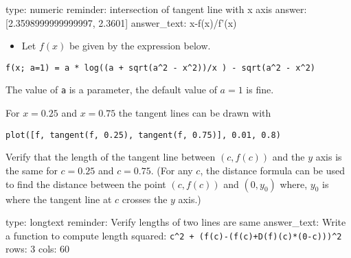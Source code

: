 \documentclass[12pt]{article}
\begin{document}
\begin{answer}
    type: numeric
    reminder: intersection of tangent line with x axis
    answer: [2.3598999999999997, 2.3601]
answer_text: x-f(x)/f'(x) 
\end{answer}

\begin{itemize}
\itemsep1pt\parskip0pt
\item
  Let $f(x)$ be given by the expression below.
\end{itemize}



\begin{verbatim}
f(x; a=1) = a * log((a + sqrt(a^2 - x^2))/x ) - sqrt(a^2 - x^2)
\end{verbatim}
The value of \texttt{a} is a parameter, the default value of $a=1$ is
fine.

For $x=0.25$ and $x=0.75$ the tangent lines can be drawn with



\begin{verbatim}
plot([f, tangent(f, 0.25), tangent(f, 0.75)], 0.01, 0.8)
\end{verbatim}
Verify that the length of the tangent line between $(c, f(c))$ and the
$y$ axis is the same for $c=0.25$ and $c=0.75$. (For any $c$, the
distance formula can be used to find the distance between the point
$(c, f(c))$ and $(0, y_0)$ where, $y_0$ is where the tangent line at $c$
crosses the $y$ axis.)

\begin{answer}
type: longtext
reminder: Verify lengths of two lines are same
answer_text: Write a function to compute length squared: \verb#c^2 + (f(c)-(f(c)+D(f)(c)*(0-c)))^2# 
rows: 3
cols: 60
\end{answer}
\end{document}

